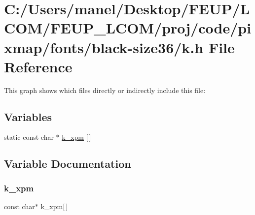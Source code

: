 \hypertarget{black-size36_2k_8h}{}\section{C\+:/\+Users/manel/\+Desktop/\+F\+E\+U\+P/\+L\+C\+O\+M/\+F\+E\+U\+P\+\_\+\+L\+C\+O\+M/proj/code/pixmap/fonts/black-\/size36/k.h File Reference}
\label{black-size36_2k_8h}
This graph shows which files directly or indirectly include this file\+:
\subsection*{Variables}
\begin{DoxyCompactItemize}
\item 
static const char $\ast$ \mbox{\hyperlink{black-size36_2k_8h_a53a6bf9ca44918840b17325487e40e52}{k\+\_\+xpm}} \mbox{[}$\,$\mbox{]}
\end{DoxyCompactItemize}


\subsection{Variable Documentation}
\mbox{\label{black-size36_2k_8h_a53a6bf9ca44918840b17325487e40e52}} 
\subsubsection{\texorpdfstring{k\_xpm}{k\_xpm}}
{\footnotesize\ttfamily const char$\ast$ k\+\_\+xpm\mbox{[}$\,$\mbox{]}\hspace{0.3cm}{\ttfamily [static]}}

